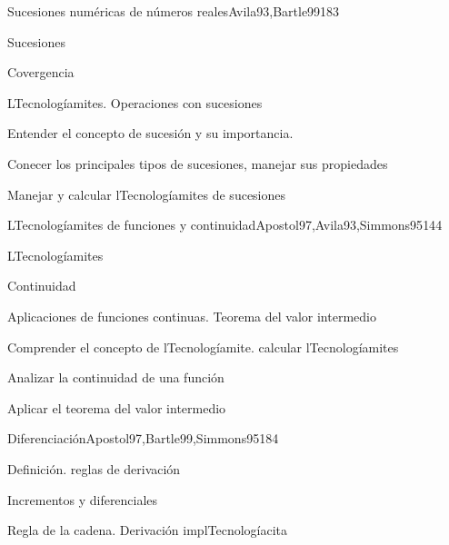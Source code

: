 \begin{syllabus}
\begin{unit}{Sucesiones numéricas de números reales}{}{Avila93,Bartle99}{18}{3}
   \begin{topics}
      \item Sucesiones
      \item Covergencia
      \item LTecnologíamites. Operaciones con sucesiones
   \end{topics}

   \begin{learningoutcomes}
      \item Entender el concepto de sucesión y su importancia.
      \item Conecer los principales tipos de sucesiones, manejar sus propiedades
      \item Manejar y calcular lTecnologíamites de sucesiones
      \end{learningoutcomes}
\end{unit}

\begin{unit}{LTecnologíamites de funciones y continuidad}{}{Apostol97,Avila93,Simmons95}{14}{4}
   \begin{topics}
      \item LTecnologíamites
      \item Continuidad
      \item Aplicaciones de funciones continuas. Teorema del valor intermedio
   \end{topics}

   \begin{learningoutcomes}
      \item Comprender el concepto de lTecnologíamite. calcular lTecnologíamites
      \item Analizar la continuidad de una función
      \item Aplicar el teorema del valor intermedio
      \end{learningoutcomes}
\end{unit}

\begin{unit}{Diferenciación}{}{Apostol97,Bartle99,Simmons95}{18}{4}
   \begin{topics}
      \item Definición. reglas de derivación
      \item Incrementos y diferenciales
      \item Regla de la cadena. Derivación implTecnologíacita
   \end{topics}


\end{unit}
\end{syllabus}
